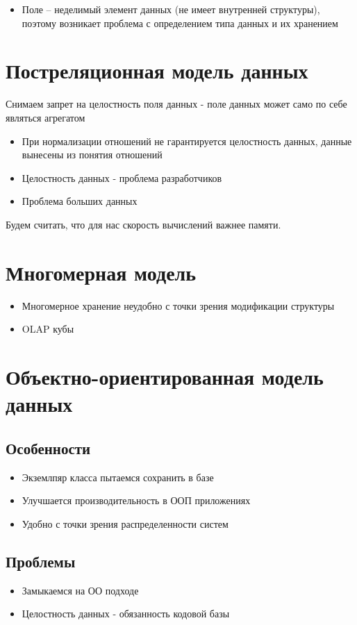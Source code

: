 \documentclass[12pt, a4paper]{article}
\begin{document}
\begin{itemize}
    \item Поле -- неделимый элемент данных (не имеет внутренней структуры), поэтому возникает проблема с определением типа данных и их хранением
\end{itemize}

\newpage

\section{Постреляционная модель данных}

Снимаем запрет на целостность поля данных - поле данных может само по себе являться агрегатом

\begin{itemize}
    \item При нормализации отношений не гарантируется целостность данных, данные вынесены из понятия отношений
    \item Целостность данных - проблема разработчиков
    \item Проблема больших данных
\end{itemize}

Будем считать, что для нас скорость вычислений важнее памяти.


\section{Многомерная модель}

\begin{itemize}
    \item Многомерное хранение неудобно с точки зрения модификации структуры
    \item OLAP кубы
\end{itemize}

\section{Объектно-ориентированная модель данных}

\subsection{Особенности}
\begin{itemize}
    \item Экземлпяр класса пытаемся сохранить в базе
    \item Улучшается производительность в ООП приложениях
    \item Удобно с точки зрения распределенности систем
\end{itemize}

\subsection{Проблемы}

\begin{itemize}
    \item Замыкаемся на ОО подходе
    \item Целостность данных - обязанность кодовой базы
\end{itemize}
\end{document}
